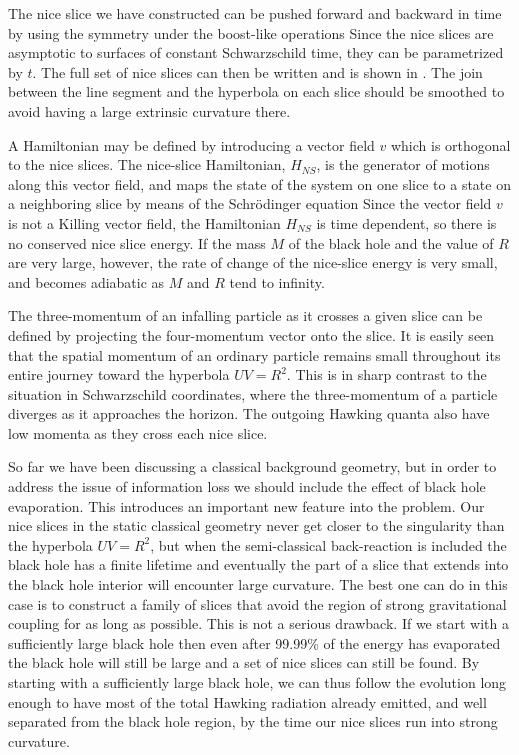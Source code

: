 The nice slice we have constructed can be pushed forward and backward
in time by using the symmetry under the boost-like operations
\eqn{}
Since the nice slices are asymptotic to surfaces of constant
Schwarzschild time, they can be parametrized by $t$.  The full set of
nice slices can then be written
\eqn{}
and is shown in \ftwo.  The join between the line segment and the
hyperbola on each slice should be smoothed to avoid having a large
extrinsic curvature there.

A Hamiltonian may be defined by introducing a vector field $v$ which
is orthogonal to the nice slices.  The nice-slice Hamiltonian,
$H_{NS}$, is the generator of motions along this vector field, and
maps the state of the system on one slice to a state on a
neighboring slice by means of the Schr\"odinger equation
\eqn{}
Since the vector field $v$ is not a Killing vector field, the
Hamiltonian $H_{NS}$ is time dependent, so there is no conserved nice
slice energy.  If the mass $M$ of the black hole and the value of $R$
are very large, however, the rate of change of the nice-slice energy
is very small, and becomes adiabatic as $M$ and $R$ tend to infinity.

The three-momentum of an infalling particle as it crosses a given
slice can be defined by projecting the four-momentum vector onto the
slice.  It is easily seen that the spatial momentum of an ordinary
particle remains small throughout its entire journey toward the
hyperbola $UV = R^2$.  This is in sharp contrast to the situation in
Schwarzschild coordinates, where the three-momentum of a particle
diverges as it approaches the horizon.  The outgoing Hawking quanta
also have low momenta as they cross each nice slice.

So far we have been discussing a classical background geometry,
but in order to address the issue of information loss we should
include the effect of black hole evaporation.  This introduces an
important new feature into the problem.  Our nice slices in the
static classical geometry never get closer to the singularity than
the hyperbola $UV=R^2$, but when the semi-classical back-reaction
is included the black hole has a finite lifetime and eventually
the part of a slice that extends into the black hole interior will
encounter large curvature.  The best one can do in this case is
to construct a family of slices that avoid the region of strong
gravitational coupling for as long as possible.  This is not a
serious drawback.  If we start with a sufficiently large black
hole then even after 99.99\% of the energy has evaporated the
black hole will still be large and a set of nice slices can still
be found.  By starting with a sufficiently large black hole, we can
thus follow the evolution long enough to have most of the total
Hawking radiation already emitted, and well separated from the
black hole region, by the time our nice slices run into strong
curvature.

